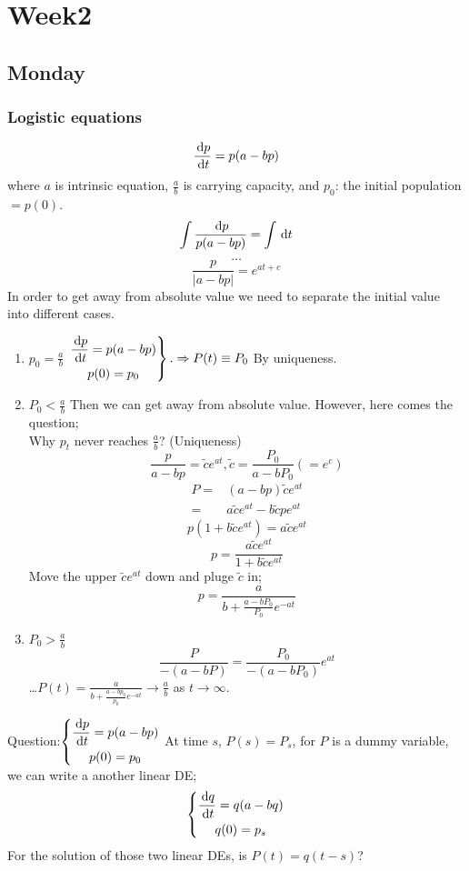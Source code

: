 
\chapter{Week2}

\section{Monday}
\subsection{Logistic equations}
\[\frac{\,\mathrm{d} p}{\,\mathrm{d} t}=p(a-bp)
\]
where $a$ is intrinsic equation, $\frac{a}{b}$ is carrying capacity, and $p_0$: the initial population $=p(0)$.
\[\int\frac{\,\mathrm{d} p}{p(a-bp)}=\int\,\mathrm{d} t
\]
\[\dots
\]
\[\frac{p}{|a-bp|}=e^{at+c}
\]
In order to get away from absolute value we need to separate the initial value into different cases.
\begin{enumerate}
\item
$p_0=\frac{a}{b}$ 
$\left.  \begin{gathered}
\frac{\,\mathrm{d} p}{\,\mathrm{d} t}=p(a-bp)	\\
p(0)=p_0
\end{gathered}\right\}.\Rightarrow P(t)\equiv P_0$
By uniqueness.
\item
 $P_0<\frac{a}{b}$ Then we can get away from absolute value. However, here comes the question;\\
Why $p_t$ never reaches $\frac{a}{b}$? (Uniqueness)\\%
\[\frac{p}{a-bp}=\tilde{c}e^{at}, \tilde{c}=\frac{P_0}{a-bP_0}(=e^c)
\]
\[\begin{aligned}
P=&(a-bp)\tilde{c}e^{at}\\
=&a\tilde{c}e^{at}-b\tilde{c}pe^{at}
\end{aligned}
\]
\[p(1+b\tilde{c}e^{at})=a\tilde{c}e^{at}\]
\[p=\frac{a\tilde{c}e^{at}}{1+b\tilde{c}e^{at}}\]
Move the upper $\tilde{c}e^{at}$ down and pluge $\tilde{c}$ in;
\[p=\frac{a}{b+\frac{a-bP_0}{P_0}e^{-at}}
\]
\item
$P_0>\frac{a}{b}$
\[\frac{P}{-(a-bP)}=\frac{P_0}{-(a-bP_0)}e^{at}
\]
\dots$\boxed{P(t)=\frac{a}{b+\frac{a-bp_0}{p_0}e^{-at}}\rightarrow\frac{a}{b}}$ as $t\rightarrow\infty$.

\end{enumerate}


Question:$\left \{	\begin{gathered}
\frac{\,\mathrm{d} p}{\,\mathrm{d} t}=p(a-bp)	\\
p(0)=p_0
\end{gathered}\right.$ At time $s$, $P(s)=P_s$, for $P$ is a dummy variable, we can write a another linear DE; \[\left \{	\begin{gathered}
\frac{\,\mathrm{d} q}{\,\mathrm{d} t}=q(a-bq)	\\
q(0)=p_s
\end{gathered}\right.\]
For the solution of those two linear DEs, is $P(t)=q(t-s)$?

